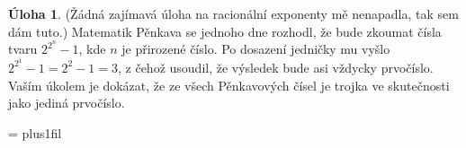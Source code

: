 \documentclass[10pt,a5paper]{extarticle}
\let\results\newpage
\let\endresults\relax
\theoremstyle{definition}
\newtheorem{uloha}{\atr Úloha}
\def\vysld{}
\let\printvysl\relax
\let\printalphvysl\relax
\def\atr{}
\def\interest{\def\atr{\llap{$\star$ }\gdef\atr{}}}
\begin{document}
\interest
\begin{uloha}
(Žádná zajímavá úloha na racionální exponenty mě nenapadla, tak sem dám tuto.)
Matematik Pěnkava se jednoho dne rozhodl, že bude zkoumat čísla tvaru $2^{2^n} - 1$, kde $n$ je přirozené číslo. Po dosazení jedničky mu vyšlo $2^{2^1} - 1 = 2^2 - 1 = 3$, z čehož usoudil, že výsledek bude asi vždycky prvočíslo. Vaším úkolem je dokázat, že ze všech Pěnkavových čísel je trojka ve skutečnosti jako jediná prvočíslo.
\end{uloha}


\baselineskip
{}


\results
\parindent=0pt
\parskip=\smallskipamount
\rightskip=0pt plus1fil\relax
\def\printvysl#1#2{\textbf{#1.} #2\par}
\def\printalphvysl#1#2#3{\textbf{#1}(#2)\ #3\par}
\vysld
\endresults



\end{document}
